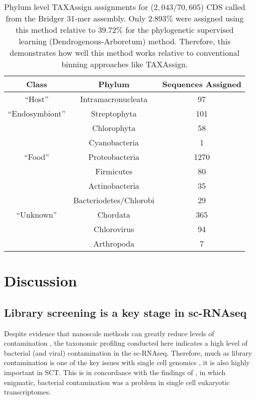 \begin{table}
    \centering
	\begin{tabular}{| c | c | c |}
\hline
\textbf{Class} & \textbf{Phylum} & \textbf{Sequences Assigned} \\
\hline
``Host'' & Intramacronucleata & 97 \\
``Endosymbiont'' & Streptophyta & 101 \\
				 & Chlorophyta & 58 \\
				 & Cyanobacteria & 1 \\
``Food'' & Proteobacteria & 1270 \\
	& Firmicutes & 80 \\
	& Actinobacteria & 35 \\
	& Bacteriodetes/Chlorobi & 29\\
``Unknown'' & Chordata & 365 \\

& Chlorovirus & 94 \\ 
			& Arthropoda & 7 \\
			\hline 
	\end{tabular}
    \caption[TAXAssign taxonomic assignments]{Phylum level TAXAssign assignments for (\(2,043/70,605\)) CDS called from the Bridger 31-mer assembly.
            Only \(2.893\%\) were assigned using this method relative to  \(39.72\%\) for 
        the phylogenetic supervised learning (Dendrogenous-Arboretum) method.  Therefore, this demonstrates 
        how well this method works relative to conventional binning approaches like TAXAssign.}
	\label{tab:taxassign}
\end{table}


\section{Discussion}

\subsection{Library screening is a key stage in sc-RNAseq}

Despite evidence that nanoscale methods can greatly reduce levels of contamination \citep{Blainey2011}, 
the taxonomic profiling conducted here
indicates a high level of bacterial (and viral) contamination in the sc-RNAseq.  
Therefore, much as library contamination is one of the key issues with single cell genomics \citep{Blainey2013,Lusk2014}, it is also highly
important in SCT.  This is in concordance with the findings of \citep{Kolisko2014}, 
in which enigmatic, bacterial contamination was a problem in single cell eukaryotic
transcriptomes.   

